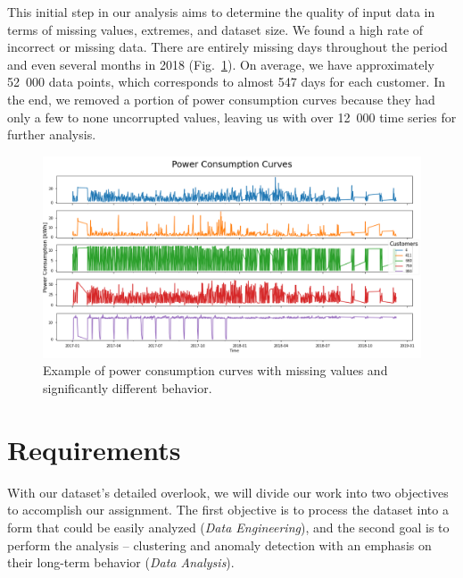 This initial step in our analysis aims to determine the quality of input data in terms of missing values, extremes, and dataset size. We found a high rate of incorrect or missing data. There are entirely missing days throughout the period and even several months in 2018 (Fig.~\ref{fig:dataset-example}). On average, we have approximately 52~000 data points, which corresponds to almost 547 days for each customer. In the end, we removed a portion of power consumption curves because they had only a few to none uncorrupted values, leaving us with over 12~000 time series for further analysis.
\begin{figure}[h]
    \centering
    \includegraphics[width=\textwidth]{img/dataset-example.png}
    \caption{Example of power consumption curves with missing values and significantly different behavior.}
    \label{fig:dataset-example}
\end{figure}


\section{Requirements}

With our dataset's detailed overlook, we will divide our work into two objectives to accomplish our assignment. The first objective is to process the dataset into a form that could be easily analyzed (\textit{Data Engineering}), and the second goal is to perform the analysis -- clustering and anomaly detection with an emphasis on their long-term behavior (\textit{Data Analysis}).


